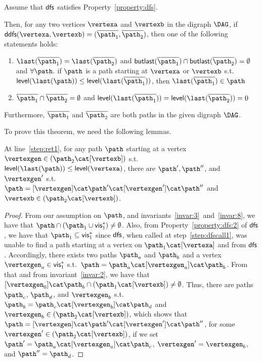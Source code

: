 \begin{mythm}
  \label{thm:ddfsvalid}
  Assume that $\textsf{\upshape dfs}$ satisfies Property~\ref{property:dfs}.

  Then, for any two vertices $\vertexa$ and $\vertexb$ in the digraph $\digraph$, if $\ddfs(\vertexa,\vertexb) = (\patharet,\pathbret)$, then one of the following statements holds:
  \begin{enumerate}
  \item $\last(\patharet) = \last (\pathbret)$ and $\butlast(\patharet) \cap \butlast(\pathbret) = \emptyset$ and $\forall\path.$ if $\path$ is a path starting at $\vertexa$ or $\vertexb$ s.t. $\level(\last(\path)) \leq \level(\last(\patharet))$, then $\last(\patharet)\in\path$
  \item $\patharet \cap \pathbret = \emptyset$ and $\level(\last(\patharet)) = \level(\last(\pathbret)) = 0$
  \end{enumerate}
  Furthermore, $\patharet$ and $\pathbret$ are both paths in the given digraph $\DAG$.
\end{mythm}
To prove this theorem, we need the following lemmas.

\begin{mylem}
\label{lem:ddfs:1}
At line~\ref{step:ret1}, for any path $\path$ starting at a vertex $\vertexgen\in(\pathb\cat[\vertexb])$ s.t.\ $\level(\last(\path)) \leq \level(\vertexa)$, there are $\path',\path''$, and $\vertexgen'$ s.t.\ $\path=[\vertexgen]\cat\path'\cat[\vertexgen']\cat\path''$ and $\vertexb\in(\pathb\cat[\vertexb])$.
\end{mylem}
\begin{proof}
From our assumption on $\path$, and invariants~\ref{invar:3}~and~\ref{invar:8}, we have that $\path\cap(\patha\cup\visa^*)\neq\emptyset$.
Also, from Property~\ref{property:dfs:2} of $\textsf{\upshape dfs}$, we have that $\patha\subseteq\visa^*$ since $\textsf{\upshape dfs}$, when called at step~\ref{step:dfscall1}, was unable to find a path starting at a vertex on $\patha\cat[\vertexa]$ and from $\textsf{\upshape dfs}$.
Accordingly, there exists two paths $\path_a$ and $\path_b$ and a vertex $\vertexgen_a\in\visa^*$ s.t.\ $\path=\path_a\cat[\vertexgen_a]\cat\path_b$.
From that and from invariant~\ref{invar:2}, we have that $[\vertexgen_0]\cat\path_b\cap(\patha\cat[\vertexb]) \neq \emptyset$.
Thus, there are paths $\path_c$, $\path_d$, and $\vertexgen_b$ s.t.\ $\path_b=\path_c\cat[\vertexgen_b]\cat\path_d$ and $\vertexgen_b\in(\pathb\cat[\vertexb])$, which shows that $\path=[\vertexgen]\cat\path'\cat[\vertexgen']\cat\path''$, for some $\vertexgen'\in(\pathb\cat[\vertexb])$, if we set $\path'=\path_a\cat[\vertexgen_a]\cat\path_c$, $\vertexgen'=\vertexgen_b$, and $\path''=\path_d$.
\end{proof}


